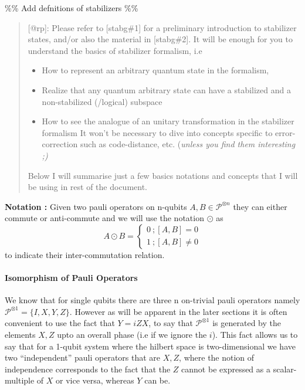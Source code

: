 \documentclass[
]{article}
\author{}
\date{}
\providecommand{\tightlist}{%
  \setlength{\itemsep}{0pt}\setlength{\parskip}{0pt}}
\begin{document}
\%\% Add defnitions of stabilizers \%\%

\begin{quote}
{[}@rp{]}: Please refer to {[}stabg\#1{]} for a preliminary introduction
to stabilizer states, and/or also the material in {[}stabg\#2{]}. It
will be enough for you to understand the basics of stabilizer formalism,
i.e

\begin{itemize}
\tightlist
\item
  How to represent an arbitrary quantum state in the formalism,
\item
  Realize that any quantum arbitrary state can have a stabilized and a
  non-stabilized (/logical) subspace
\item
  How to see the analogue of an unitary transformation in the stabilizer
  formalism It won't be necessary to dive into concepts specific to
  error-correction such as code-distance, etc. (\emph{unless you find
  them interesting ;)}
\end{itemize}

Below I will summarise just a few basics notations and concepts that I
will be using in rest of the document.
\end{quote}

\textbf{Notation :} Given two pauli operators on n-qubits
\(A,B \in \mathcal{P}^{\otimes n}\) they can either commute or
anti-commute and we will use the notation \(\odot\) as
\[A \odot B = \begin{cases} 0 \: ; [A,B] =0 \\ 1 \: ; [A,B] \neq 0 \end{cases}\]to
indicate their inter-commutation relation.

\hypertarget{isomorphism-of-pauli-operators}{%
\paragraph{Isomorphism of Pauli
Operators}\label{isomorphism-of-pauli-operators}}

We know that for single qubits there are three n on-trivial pauli
operators namely \(\mathcal{P}^{\otimes 1} = \{I, X, Y ,Z\}\). However
as will be apparent in the later sections it is often convenient to use
the fact that \(Y = i ZX\), to say that \(\mathcal{P}^{\otimes1}\) is
generated by the elements \(X,Z\) upto an overall phase (i.e if we
ignore the \(i\)). This fact allows us to say that for a 1-qubit system
where the hilbert space is two-dimensional we have two ``independent''
pauli operators that are \(X,Z\), where the notion of independence
corresponds to the fact that the \(Z\) cannot be expressed as a
scalar-multiple of \(X\) or vice versa, whereas \(Y\) can be.
\end{document}
